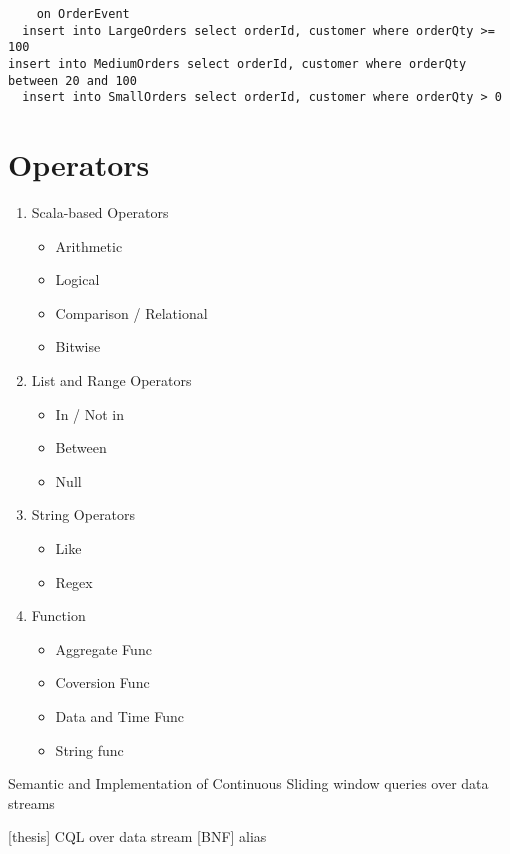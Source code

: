\begin{verbatim}
	on OrderEvent
  insert into LargeOrders select orderId, customer where orderQty >= 100
insert into MediumOrders select orderId, customer where orderQty between 20 and 100
  insert into SmallOrders select orderId, customer where orderQty > 0
\end{verbatim}


\section{Operators}
\begin{enumerate}

\item Scala-based Operators
	\begin{itemize}
        \item Arithmetic
        \item Logical
        \item Comparison / Relational
        \item Bitwise
	\end{itemize}
	
 \item List and Range Operators
 	\begin{itemize}
        \item In / Not in
        \item Between
        \item Null
 	\end{itemize}
 \item String Operators
 	\begin{itemize}
        \item Like
        \item Regex
 	\end{itemize}
 \item Function 
 	\begin{itemize}
        \item Aggregate Func
        \item Coversion Func
       	\item Data and Time Func
        \item String func
 	\end{itemize}

\end{enumerate}
Semantic and Implementation of Continuous Sliding window queries over data streams

[thesis] CQL over data stream [BNF] alias



